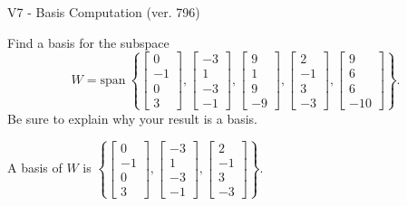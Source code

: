 \begin{exercise}
  \begin{exerciseTitle}V7 - Basis Computation (ver. 796)\end{exerciseTitle}
  \begin{exerciseStatement}
    Find a basis for the subspace 
\[W=\mathrm{span}\ \left\{\left[\begin{array}{r}
0 \\
-1 \\
0 \\
3
\end{array}\right] , \left[\begin{array}{r}
-3 \\
1 \\
-3 \\
-1
\end{array}\right] , \left[\begin{array}{r}
9 \\
1 \\
9 \\
-9
\end{array}\right] , \left[\begin{array}{r}
2 \\
-1 \\
3 \\
-3
\end{array}\right] , \left[\begin{array}{r}
9 \\
6 \\
6 \\
-10
\end{array}\right]\right\}.\]
 Be sure to explain why your result is a basis.


  \end{exerciseStatement}
  \begin{exerciseAnswer}
   A basis of \(W\) is  \(\left\{\left[\begin{array}{r}
0 \\
-1 \\
0 \\
3
\end{array}\right] , \left[\begin{array}{r}
-3 \\
1 \\
-3 \\
-1
\end{array}\right] , \left[\begin{array}{r}
2 \\
-1 \\
3 \\
-3
\end{array}\right]\right\}\).
  


  \end{exerciseAnswer}
\end{exercise}